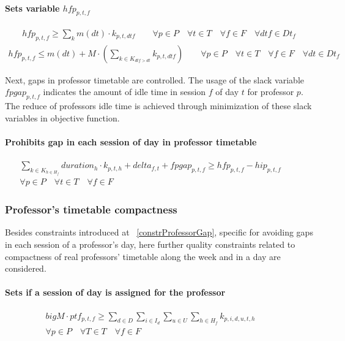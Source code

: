 \paragraph{Sets variable $hfp_{p,t,f}$}
\begin{eqnarray}
hfp_{p,t,f} \geq \sum\limits_{k} m(dt) \cdot k_{p,t,dtf} \nonumber \qquad
\forall p \in P \quad
\forall t \in T \quad
\forall f \in F \quad
\forall dtf \in Dt_{f}
\end{eqnarray}
\begin{eqnarray}
hfp_{p,t,f} \leq m(dt) + M \cdot ( \sum\limits_{k \in K_{dtf>dt}} k_{p,t,dtf} ) \nonumber \qquad
\forall p \in P \quad
\forall t \in T \quad
\forall f \in F \quad
\forall dt \in Dt_{f}
\end{eqnarray}

Next, gaps in professor timetable are controlled. The usage of the slack variable $fpgap_{p,t,f}$ indicates the amount of idle time in session $f$ of day $t$ for professor $p$. The reduce of professors idle time is achieved through minimization of these slack variables in objective function.

\paragraph{Prohibits gap in each session of day in professor timetable}
\begin{eqnarray}
\sum\limits_{k \in K_{h \in H_{f}}} duration_{h} \cdot k_{p,t,h} + delta_{f,t} + fpgap_{p,t,f} \geq hfp_{p,t,f} - hip_{p,t,f} \nonumber \qquad
\\
\forall p \in P \quad
\forall t \in T \quad
\forall f \in F \quad \nonumber
\end{eqnarray}



\subsubsection{Professor's timetable compactness}
\label{constrProfCompact}

Besides constraints introduced at ~\ref{constrProfessorGap}, specific for avoiding gaps in each session of a professor's day, here further quality constraints related to compactness of real professors' timetable along the week and in a day are considered.


\paragraph{Sets if a session of day is assigned for the professor}
\begin{eqnarray}
bigM \cdot ptf_{p,t,f} \ge \sum\limits_{d \in D}\sum\limits_{i \in I_{d}}\sum\limits_{u \in U}\sum\limits_{h \in H_{f}} k_{p,i,d,u,t,h} \nonumber \qquad
\\
\forall p \in P \quad
\forall T \in T \quad
\forall f \in F \nonumber
\end{eqnarray}

